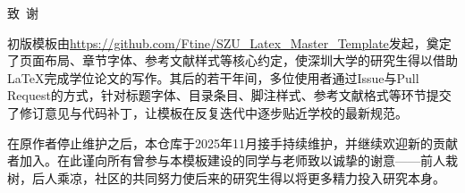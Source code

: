 \begin{szuAppendix}{致~谢}

\songti{} %
\setlength{\baselineskip}{23pt}

初版模板由\url{https://github.com/Ftine/SZU_Latex_Master_Template}发起，奠定了页面布局、章节字体、参考文献样式等核心约定，使深圳大学的研究生得以借助LaTeX完成学位论文的写作。其后的若干年间，多位使用者通过Issue与Pull Request的方式，针对标题字体、目录条目、脚注样式、参考文献格式等环节提交了修订意见与代码补丁，让模板在反复迭代中逐步贴近学校的最新规范。

在原作者停止维护之后，本仓库于2025年11月接手持续维护，并继续欢迎新的贡献者加入。在此谨向所有曾参与本模板建设的同学与老师致以诚挚的谢意——前人栽树，后人乘凉，社区的共同努力使后来的研究生得以将更多精力投入研究本身。

\end{szuAppendix}
